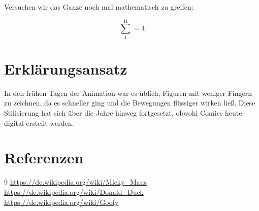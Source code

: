 \documentclass{article}
\begin{document}
Versuchen wir das Ganze noch mal mathematisch zu greifen:

$$
\sum_1^41=4
$$

\section{Erklärungsansatz}

In den frühen Tagen der Animation war es üblich, Figuren mit weniger Fingern zu 
zeichnen, da es schneller ging und die Bewegungen flüssiger wirken ließ. Diese 
Stilisierung hat sich über die Jahre hinweg fortgesetzt, obwohl Comics heute digital 
erstellt werden.

\section{Referenzen}

\begin{thebibliography}{9}
 \url{https://de.wikipedia.org/wiki/Micky_Maus}
 \url{https://de.wikipedia.org/wiki/Donald_Duck}
 \url{https://de.wikipedia.org/wiki/Goofy}
\end{thebibliography}
\end{document}
